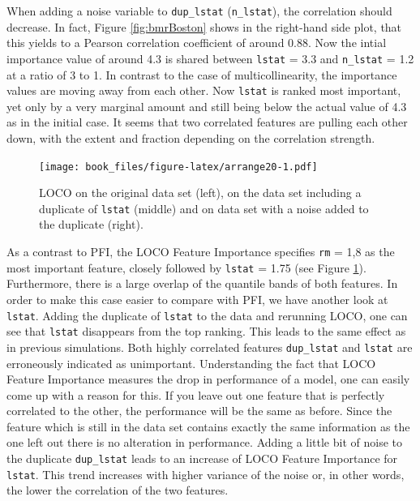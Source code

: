 \documentclass[]{krantz}
\begin{document}
When adding a noise variable to \texttt{dup\_lstat} (\texttt{n\_lstat}),
the correlation should decrease. In fact, Figure \ref{fig:bmrBoston}
shows in the right-hand side plot, that this yields to a Pearson
correlation coefficient of around \(0.88\). Now the intial importance
value of around 4.3 is shared between \texttt{lstat} = 3.3 and
\texttt{n\_lstat} = 1.2 at a ratio of 3 to 1. In contrast to the case of
multicollinearity, the importance values are moving away from each
other. Now \texttt{lstat} is ranked most important, yet only by a very
marginal amount and still being below the actual value of 4.3 as in the
initial case. It seems that two correlated features are pulling each
other down, with the extent and fraction depending on the correlation
strength.

\begin{figure}
\centering
\texttt{[image: book\_files/figure-latex/arrange20-1.pdf]}
\caption{\label{fig:arrange20}LOCO on the original data set (left), on the
data set including a duplicate of \texttt{lstat} (middle) and on data
set with a noise added to the duplicate (right).}
\end{figure}

As a contrast to PFI, the LOCO Feature Importance specifies \texttt{rm}
= 1,8 as the most important feature, closely followed by \texttt{lstat}
= 1.75 (see Figure \ref{fig:arrange20}). Furthermore, there is a large
overlap of the quantile bands of both features. In order to make this
case easier to compare with PFI, we have another look at \texttt{lstat}.
Adding the duplicate of \texttt{lstat} to the data and rerunning LOCO,
one can see that \texttt{lstat} disappears from the top ranking. This
leads to the same effect as in previous simulations. Both highly
correlated features \texttt{dup\_lstat} and \texttt{lstat} are
erroneously indicated as unimportant. Understanding the fact that LOCO
Feature Importance measures the drop in performance of a model, one can
easily come up with a reason for this. If you leave out one feature that
is perfectly correlated to the other, the performance will be the same
as before. Since the feature which is still in the data set contains
exactly the same information as the one left out there is no alteration
in performance. Adding a little bit of noise to the duplicate
\texttt{dup\_lstat} leads to an increase of LOCO Feature Importance for
\texttt{lstat}. This trend increases with higher variance of the noise
or, in other words, the lower the correlation of the two features.
\end{document}
